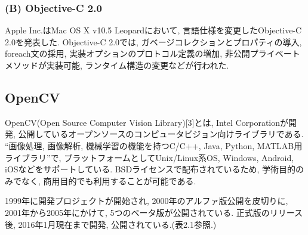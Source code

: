\subsubsection{(B) Objective-C 2.0}
Apple Inc.はMac OS X v10.5 Leopardにおいて, 言語仕様を変更したObjective-C 2.0を発表した.
Objective-C 2.0では, ガベージコレクションとプロパティの導入, foreach文の採用, 実装オプションのプロトコル定義の増加, 非公開プライベートメソッドが実装可能, ランタイム構造の変更などが行われた.

\subsection{OpenCV}
OpenCV(Open Source Computer Vision Library)[3]とは, Intel Corporationが開発, 公開しているオープンソースのコンピュータビジョン向けライブラリである.
“画像処理, 画像解析, 機械学習の機能を持つC/C++, Java, Python, MATLAB用ライブラリ”で, プラットフォームとしてUnix/Linux系OS, Windows, Android, iOSなどをサポートしている.
BSDライセンスで配布されているため, 学術目的のみでなく, 商用目的でも利用することが可能である.

1999年に開発プロジェクトが開始され, 2000年のアルファ版公開を皮切りに, 2001年から2005年にかけて, 5つのベータ版が公開されている.
正式版のリリース後, 2016年1月現在まで開発, 公開されている.(表2.1参照.)

